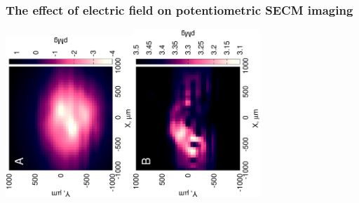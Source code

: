 \documentclass{beamer}
\begin{document}
\begin{frame}
\frametitle{The effect of electric field on potentiometric SECM imaging}
\centering
\includegraphics[trim = 10mm 20mm 0mm 10mm, clip, width=0.36\textwidth, angle=-90]{17012501.eps}\includegraphics[trim = 10mm 20mm 0mm 10mm, clip, width=0.36\textwidth, angle=-90]{17012503_deconvoluted.eps}
\end{frame}

\end{document}
